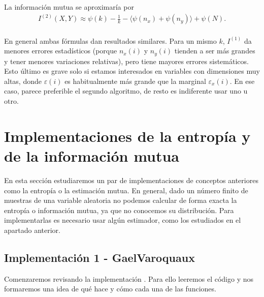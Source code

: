 \documentclass[12pt,a4paper]{report} %
\theoremstyle{definition}
\begin{document}
La información mutua se aproximaría por
\begin{align}
I^{(2)}(X,Y) \approx \psi(k) - \frac{1}{k} - \langle \psi(n_x) + \psi(n_y) \rangle + \psi(N). \label{eq:est2}
\end{align}\\[-10pt]


En general ambas fórmulas dan resultados similares. Para un mismo $k$, $I^{(1)}$ da menores errores estadísticos (porque $n_x(i)$ y $n_y(i)$ tienden a ser más grandes y tener menores variaciones relativas), pero tiene mayores errores sistemáticos. Esto último es grave solo si estamos interesados en variables con dimensiones muy altas, donde $\varepsilon(i)$ es habitualmente más grande que la marginal $\varepsilon_x(i)$. En ese caso, parece preferible el segundo algoritmo, de resto es indiferente usar uno u otro.\\

\section{Implementaciones de la entropía y de la información mutua}

En esta sección estudiaremos un par de implementaciones de conceptos anteriores como la entropía o la estimación mutua. En general, dado un número finito de muestras de una variable aleatoria no podemos calcular de forma exacta la entropía o información mutua, ya que no conocemos su distribución. Para implementarlas es necesario usar algún estimador, como los estudiados en el apartado anterior.

\subsection{Implementación 1 - GaelVaroquaux}

Comenzaremos revisando la implementación \cite{estimating}. Para ello leeremos el código y nos formaremos una idea de qué hace y cómo cada una de las funciones.
\end{document}

